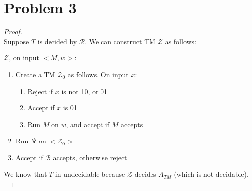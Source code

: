 \documentclass{article}
\newenvironment{problem}[1]{
  \nobreak\section*{Problem #1}
}{}
\begin{document}
  \begin{problem}{3}
    \begin{proof}
      $ $\\
      Suppose $T$ is decided by $\mathcal{R}$.  We can construct TM
      $\mathcal{Z}$ as follows:

      \begin{center}
        $\mathcal{Z}$, on input $<M, w>$: \begin{enumerate}
          \item Create a TM $\mathcal{Z}_0$ as follows.  On input $x$: \begin{enumerate}
            \item Reject if $x$ is not 10, or 01
            \item Accept if $x$ is 01
            \item Run $M$ on $w$, and accept if $M$ accepts 
          \end{enumerate}
          \item Run $\mathcal{R}$ on $<\mathcal{Z}_0>$
          \item Accept if $\mathcal{R}$ accepts, otherwise reject
        \end{enumerate}
      \end{center}

      \noindent
      We know that $T$ in undecidable because $\mathcal{Z}$ decides
      $A_{TM}$ (which is not decidable).
      $ $\\
    \end{proof}
  \end{problem}
\end{document}
